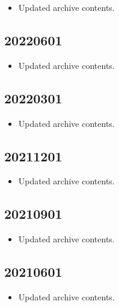\documentclass[hidelinks,a4paper,12pt]{article}
\begin{document}
\begin{itemize}
\item Updated archive contents.
\end{itemize}

\subsection{20220601}  \label{sec:changelog_20220601}

\begin{itemize}
\item Updated archive contents.
\end{itemize}

\subsection{20220301}  \label{sec:changelog_20220301}

\begin{itemize}
\item Updated archive contents.
\end{itemize}

\subsection{20211201}  \label{sec:changelog_20211201}

\begin{itemize}
\item Updated archive contents.
\end{itemize}

\subsection{20210901}  \label{sec:changelog_20210901}

\begin{itemize}
\item Updated archive contents.
\end{itemize}

\subsection{20210601}  \label{sec:changelog_20210601}

\begin{itemize}
\item Updated archive contents.
\end{itemize}
\end{document}
